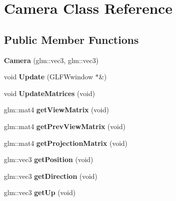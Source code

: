\hypertarget{class_camera}{}\section{Camera Class Reference}
\label{class_camera}
\subsection*{Public Member Functions}
\begin{DoxyCompactItemize}
\item 
{\bfseries Camera} (glm\+::vec3, glm\+::vec3)\hypertarget{class_camera_a7ac99ca06250df56ae81414fe54589e2}{}\label{class_camera_a7ac99ca06250df56ae81414fe54589e2}

\item 
void {\bfseries Update} (G\+L\+F\+Wwindow $\ast$\&)\hypertarget{class_camera_a0d9114c1c4de87842d227d511e045df5}{}\label{class_camera_a0d9114c1c4de87842d227d511e045df5}

\item 
void {\bfseries Update\+Matrices} (void)\hypertarget{class_camera_acdf18835a138363721f33a6d3bf085b2}{}\label{class_camera_acdf18835a138363721f33a6d3bf085b2}

\item 
glm\+::mat4 {\bfseries get\+View\+Matrix} (void)\hypertarget{class_camera_a5b68da2e7a27893a7a3a8ac85c5b788f}{}\label{class_camera_a5b68da2e7a27893a7a3a8ac85c5b788f}

\item 
glm\+::mat4 {\bfseries get\+Prev\+View\+Matrix} (void)\hypertarget{class_camera_a8566bc0b2a61fc6d74995f2dc4ea8017}{}\label{class_camera_a8566bc0b2a61fc6d74995f2dc4ea8017}

\item 
glm\+::mat4 {\bfseries get\+Projection\+Matrix} (void)\hypertarget{class_camera_a2ebb2fdd189345caa39113fcafcc6d5a}{}\label{class_camera_a2ebb2fdd189345caa39113fcafcc6d5a}

\item 
glm\+::vec3 {\bfseries get\+Position} (void)\hypertarget{class_camera_a0a32173c1f61b10ced8f674758872403}{}\label{class_camera_a0a32173c1f61b10ced8f674758872403}

\item 
glm\+::vec3 {\bfseries get\+Direction} (void)\hypertarget{class_camera_a50f87cd85fd230c6b5196e552c4fe45f}{}\label{class_camera_a50f87cd85fd230c6b5196e552c4fe45f}

\item 
glm\+::vec3 {\bfseries get\+Up} (void)\hypertarget{class_camera_ae3b6ae9df4f8003f7985e683a375899c}{}\label{class_camera_ae3b6ae9df4f8003f7985e683a375899c}


\end{DoxyCompactItemize}
